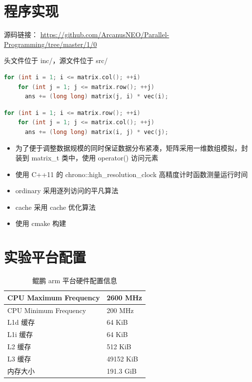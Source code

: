 \documentclass[a4paper]{article}
\begin{document}
\section{程序实现}
源码链接：
\url{https://github.com/ArcanusNEO/Parallel-Programming/tree/master/1/0}

头文件位于 inc/，源文件位于 src/

\begin{lstlisting}[title=逐列访问平凡算法,frame=trbl,language={C++}]
  for (int i = 1; i <= matrix.col(); ++i)
    for (int j = 1; j <= matrix.row(); ++j)
      ans += (long long) matrix(j, i) * vec(i);
\end{lstlisting}

\begin{lstlisting}[title=cache 优化算法,frame=trbl,language={C++}]
  for (int i = 1; i <= matrix.row(); ++i)
    for (int j = 1; j <= matrix.col(); ++j)
      ans += (long long) matrix(i, j) * vec(j);
\end{lstlisting}

\begin{itemize}
  \item 为了便于调整数据规模的同时保证数据分布紧凑，矩阵采用一维数组模拟，封装到 matrix_t 类中，使用 operator() 访问元素
  \item 使用 C++11 的 chrono::high_resolution_clock 高精度计时函数测量运行时间
  \item ordinary 采用逐列访问的平凡算法
  \item cache 采用 cache 优化算法
  \item 使用 cmake 构建
\end{itemize}

\section{实验平台配置}
\begin{table}[]
  \centering
  \begin{tabular}{ll}
    \hline
    CPU Maximum Frequency & 2600 MHz  \\   \hline
    CPU Minimum Frequency & 200 MHz   \\   \hline
    L1d 缓存              & 64 KiB    \\   \hline
    L1i 缓存              & 64 KiB    \\   \hline
    L2 缓存               & 512 KiB   \\   \hline
    L3 缓存               & 49152 KiB \\   \hline
    内存大小              & 191.3 GiB \\   \hline
  \end{tabular}
  \caption{鲲鹏 arm 平台硬件配置信息}
  \label{tab:arm-arch}
\end{table}
\end{document}
